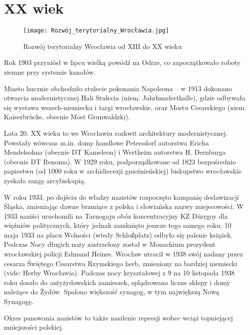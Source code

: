 \documentclass{article}
\begin{document}
\section{XX wiek}

\begin{wrapfigure}{r}{0.42\textwidth} 
\begin{center}
\vspace{-20pt}
\texttt{[image: Rozwój\_terytorialny\_Wrocławia.jpg]}
\end{center}
\vspace{-20pt}
\caption{Rozwój terytorialny Wrocławia od XIII do XX wieku}
\vspace{-10pt}
\end{wrapfigure}

Rok 1903 przyniósł w lipcu wielką powódź na Odrze, co zapoczątkowało roboty ziemne przy systemie kanałów.

Miasto hucznie obchodziło stulecie pokonania Napoleona – w 1913 dokonano otwarcia modernistycznej Hali Stulecia (niem. Jahrhunderthalle), gdzie odbywała się wystawa wszech-niemiecka i targi wrocławskie, oraz Mostu Cesarskiego (niem. Kaiserbrücke, obecnie Most Grunwaldzki).

Lata 20. XX wieku to we Wrocławiu rozkwit architektury modernistycznej. Powstały wówczas m.in. domy handlowe Petersdorf autorstwa Ericha Mendelsohna (obecnie DT Kameleon) i Wertheim autorstwa H. Dernburga (obecnie DT Renoma). W 1929 roku, podporządkowane od 1823 bezpośrednio papiestwu (od 1000 roku w archidiecezji gnieźnieńskiej) biskupstwo wrocławskie zyskało rangę arcybiskupią.

W roku 1933, po dojściu do władzy nazistów rozpoczęto kampanię deslawizacji Śląska, zmieniając dawne brzmiące z polska i słowiańska nazwy miejscowości. W 1933 naziści uruchomili na Tarnogaju obóz koncentracyjny KZ Dürrgoy dla więźniów politycznych, który jednak zamknięto jeszcze tego samego roku. 10 maja 1933 na placu Wolności (wtedy Schloßplatz) odbyło się palenie książek. Podczas Nocy długich noży zastrzelony został w Monachium prezydent wrocławskiej policji Edmund Heines. Wrocław utracił w 1938 swój nadany przez cesarza Świętego Cesarstwa Rzymskiego herb, zmieniony na bardziej niemiecki (vide: Herby Wrocławia). Podczas nocy kryształowej z 9 na 10 listopada 1938 roku doszło do antyżydowskich zamieszek, splądrowano liczne sklepy i domy należące do Żydów. Spalono większość synagog, w tym największą Nową Synagogę.

Okres panowania nazistów to także nasilenie represji wobec wciąż topniejącej mniejszości polskiej.
\newpage
\end{document}
